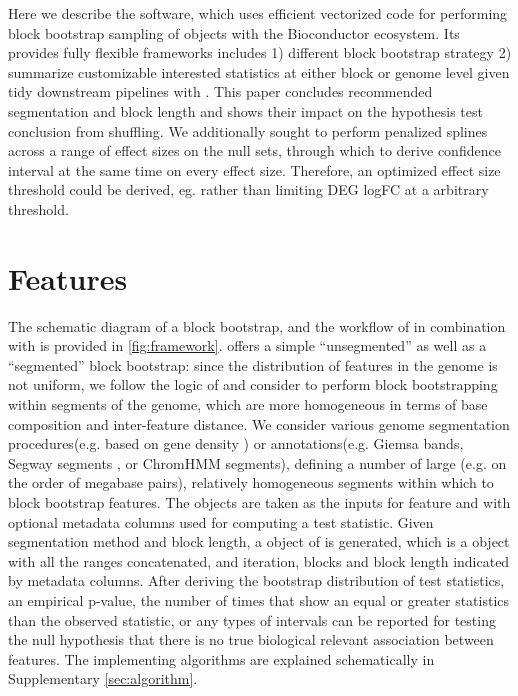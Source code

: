 Here we describe the \bootranges software, which uses efficient
vectorized code for performing block bootstrap sampling of
\granges \citep{lawrence2013software} objects with the Bioconductor
ecosystem.
Its provides fully flexible frameworks includes 1)
different block bootstrap strategy 2) summarize customizable
interested statistics at either block or genome level given tidy
downstream pipelines with \plyranges \citep{lee2019plyranges}. This
paper concludes recommended segmentation and block length and shows
their impact on the hypothesis test conclusion from shuffling.  We
additionally sought to perform penalized splines across a range of
effect sizes on the null sets, through which to derive confidence
interval at the same time on every effect size. Therefore, an
optimized effect size threshold could be derived, eg. rather than
limiting DEG logFC at a arbitrary threshold.

\vspace*{-20pt}

\section{Features}
The schematic diagram of a block bootstrap, and the workflow of \bootranges in combination with \plyranges is provided in \cref{fig:framework}. \bootranges offers a simple ``unsegmented'' as well as a ``segmented'' block bootstrap:
since the distribution of features in the genome is not uniform, we follow the logic of \citet{bickel2010subsampling} and consider to perform block bootstrapping within segments of the genome, which are more homogeneous in terms of base composition and inter-feature distance.
We consider various genome segmentation procedures(e.g. based on gene density ) or annotations(e.g. Giemsa bands, 
Segway segments \citep{hoffman:Segway}, or ChromHMM segments\citep{ernst2012chromhmm}), defining a number of large (e.g. on the order of megabase pairs), relatively homogeneous segments within which to block bootstrap features.
The \granges objects are taken as the inputs for feature  and  with optional metadata columns used for computing a test statistic. Given segmentation method and block length, a \bootranges object of  is generated, which is a \granges object with all the ranges concatenated, and iteration, blocks and block length indicated by metadata columns. 
After deriving the bootstrap distribution of test statistics, an empirical p-value, the number of times that show an equal or greater statistics than the observed statistic, or any types of intervals can be reported for testing the null hypothesis that there is no true biological relevant association between features. 
The \bootranges implementing algorithms are explained schematically in Supplementary \cref{sec:algorithm}.

